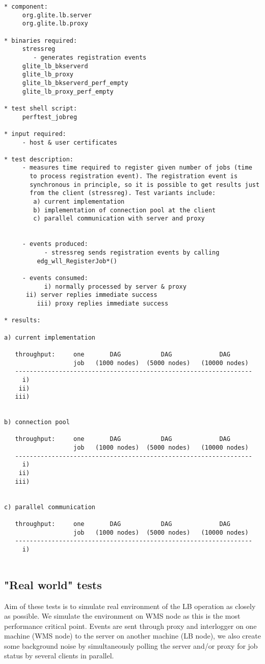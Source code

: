 \begin{verbatim}
* component:
     org.glite.lb.server
     org.glite.lb.proxy

* binaries required:
     stressreg
        - generates registration events
     glite_lb_bkserverd
     glite_lb_proxy
     glite_lb_bkserverd_perf_empty
     glite_lb_proxy_perf_empty

* test shell script:
     perftest_jobreg

* input required:
     - host & user certificates

* test description:
     - measures time required to register given number of jobs (time
       to process registration event). The registration event is
       synchronous in principle, so it is possible to get results just
       from the client (stressreg). Test variants include:
	    a) current implementation
	    b) implementation of connection pool at the client
	    c) parallel communication with server and proxy


     - events produced:
           - stressreg sends registration events by calling
	     edg_wll_RegisterJob*()

     - events consumed:
           i) normally processed by server & proxy
	  ii) server replies immediate success
         iii) proxy replies immediate success

* results:

a) current implementation

   throughput:     one       DAG           DAG             DAG
                   job   (1000 nodes)  (5000 nodes)   (10000 nodes)
   -----------------------------------------------------------------
     i)
    ii)
   iii)


b) connection pool

   throughput:     one       DAG           DAG             DAG
                   job   (1000 nodes)  (5000 nodes)   (10000 nodes)
   -----------------------------------------------------------------
     i)
    ii)
   iii)


c) parallel communication

   throughput:     one       DAG           DAG             DAG
                   job   (1000 nodes)  (5000 nodes)   (10000 nodes)
   -----------------------------------------------------------------
     i)


\end{verbatim}

\subsection{"Real world" tests}

Aim of these tests is to simulate real environment of the LB operation as
closely as possible. We simulate the environment on WMS node as this is the
most performance critical point. Events are sent through proxy and interlogger
on one machine (WMS node) to the server on another machine (LB node), we also
create some background noise by simultaneously polling the server and/or proxy
for job status by several clients in parallel.


